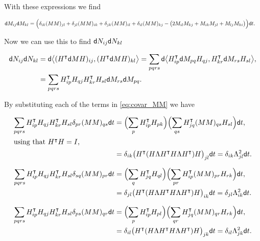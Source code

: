 With these expressions we find

\begin{align}\label{eq:covar_MM}
    \mathsf d M_{ij}\mathsf d M_{kl} &= \Bigl( \delta_{ik}(MM)_{jl} + \delta_{jl}(MM)_{ik} + \delta_{jk}(MM)_{il} + \delta_{il}(MM)_{kj} - \bigl( 2M_{il}M_{kj} + M_{ik}M_{jl} + M_{lj}M_{ki} \bigr) \Bigr)\mathsf d t.
\end{align}

Now we can use this to find $\mathsf d N_{ij}\mathsf d N_{kl}$

\begin{align*}
    \mathsf d N_{ij}\mathsf d N_{kl} &= \mathsf d \bigl< (H^{\intercal}\mathsf d M H)_{ij},(H^{\intercal}\mathsf d M H)_{kl}\bigr> = \sum_{pqrs} \mathsf d \bigl< H^{\intercal}_{ip} \mathsf d M_{pq} H_{qj}, H^{\intercal}_{kr} \mathsf d M_{rs} H_{sl} \bigr>, \\
    &= \sum_{pqrs} H^{\intercal}_{ip} H_{qj} H^{\intercal}_{kr} H_{sl} \mathsf d M_{rs} \mathsf d M_{pq}.
\end{align*}

By substituting each of the terms in \eqref{eq:covar_MM} we have

\begin{align*}
    \sum_{pqrs} H^{\intercal}_{ip} H_{qj} H^{\intercal}_{kr} H_{sl}\delta_{pr}(MM)_{qs}\mathsf d t &= \Bigl(\sum_{p} H^{\intercal}_{ip}H_{pk}\Bigr)\Bigl(\sum_{qs} H^{\intercal}_{jq}(MM)_{qs}H_{sl}\Bigr)\mathsf d t,\\
    \intertext{using that $H^{\intercal} H = I$, }
    &= \delta_{ik}\bigl( H^{\intercal}(H\Lambda H^{\intercal}H\Lambda H^{\intercal})H \bigr)_{jl} \mathsf d t = \delta_{ik}\Lambda^2_{jl} \mathsf d t.
\end{align*}

\begin{align*}
    \sum_{pqrs} H^{\intercal}_{ip} H_{qj} H^{\intercal}_{kr} H_{sl}\delta_{sq}(MM)_{pr}\mathsf d t &= \Bigl(\sum_{q} H^{\intercal}_{jq}H_{ql}\Bigr)\Bigl(\sum_{pr} H^{\intercal}_{ip}(MM)_{pr}H_{rk}\Bigr)\mathsf d t,\\
    &= \delta_{jl}\bigl( H^{\intercal}(H\Lambda H^{\intercal}H\Lambda H^{\intercal})H \bigr)_{ik} \mathsf d t = \delta_{jl}\Lambda^2_{ik} \mathsf d t.
\end{align*}

\begin{align*}
    \sum_{pqrs} H^{\intercal}_{ip} H_{qj} H^{\intercal}_{kr} H_{sl}\delta_{ps}(MM)_{qr}\mathsf d t &= \Bigl(\sum_{p} H^{\intercal}_{ip}H_{pl}\Bigr)\Bigl(\sum_{qr} H^{\intercal}_{jq}(MM)_{qr}H_{rk}\Bigr)\mathsf d t,\\
    &= \delta_{il}\bigl( H^{\intercal}(H\Lambda H^{\intercal}H\Lambda H^{\intercal})H \bigr)_{jk} \mathsf d t = \delta_{il}\Lambda^2_{jk} \mathsf d t.
\end{align*}


